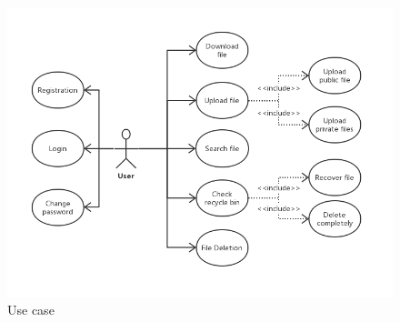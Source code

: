 \documentclass[a4paper,11pt]{article}
\begin{document}
\begin{figure}[ht]

\centering
\includegraphics[scale=0.6]{Usecase.png}
\caption{Use case}
\label{fig:Usecase}
\end{figure}
\end{document}
